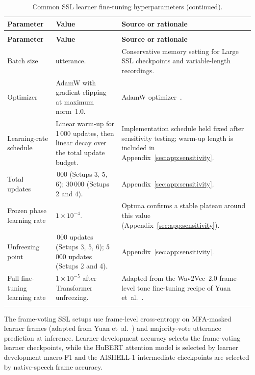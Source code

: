\begingroup
\small
\setlength{\tabcolsep}{4pt}
\begin{longtable}{@{}>{\raggedright\arraybackslash}p{}
>{\raggedright\arraybackslash}p{}
>{\raggedright\arraybackslash}p{}@{}}
\caption{Common SSL learner fine-tuning hyperparameters.}
\label{tab:app:ssl_common_hparams}\\
\toprule
\textbf{Parameter} & \textbf{Value} & \textbf{Source or rationale} \\
\midrule
\endfirsthead
\caption[]{Common SSL learner fine-tuning hyperparameters (continued).}\\
\toprule
\textbf{Parameter} & \textbf{Value} & \textbf{Source or rationale} \\
\midrule
\endhead
\bottomrule
\endfoot
Batch size & 1 utterance. & Conservative memory setting for Large SSL checkpoints and variable-length recordings. \\
\addlinespace
Optimizer & AdamW with gradient clipping at maximum norm~1.0. & AdamW optimizer~\cite{loshchilov2019decoupled}. \\
\addlinespace
Learning-rate schedule & Linear warm-up for 1\,000 updates, then linear decay over the total update budget. & Implementation schedule held fixed after sensitivity testing; warm-up length is included in Appendix~\ref{sec:app:sensitivity}. \\
\addlinespace
Total updates & 40\,000 (Setups 3, 5, 6); 30\,000 (Setups 2 and 4). & Appendix~\ref{sec:app:sensitivity}. \\
\addlinespace
Frozen phase learning rate & \(1\times10^{-4}\). & Optuna confirms a stable plateau around this value (Appendix~\ref{sec:app:sensitivity}). \\
\addlinespace
Unfreezing point & 2\,000 updates (Setups 3, 5, 6); 5\,000 updates (Setups 2 and 4). & Appendix~\ref{sec:app:sensitivity}. \\
\addlinespace
Full fine-tuning learning rate & \(1\times10^{-5}\) after Transformer unfreezing. & Adapted from the Wav2Vec~2.0 frame-level tone fine-tuning recipe of Yuan et~al.~\cite{yuan2023}. \\
\addlinespace
\end{longtable}
\endgroup

The frame-voting SSL setups use frame-level cross-entropy on MFA-masked learner
frames (adapted from Yuan et~al.~\cite{yuan2023}) and majority-vote utterance
prediction at inference. Learner development accuracy selects the frame-voting
learner checkpoints, while the HuBERT attention model is selected by learner
development macro-F1 and the AISHELL-1 intermediate checkpoints are selected by
native-speech frame accuracy.

